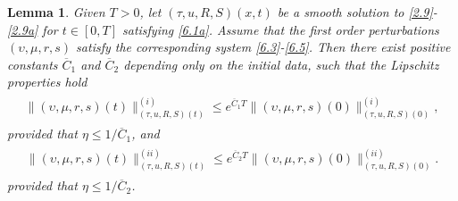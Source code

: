 \documentclass[11pt,reqno]{article}
\newtheorem{lem}{Lemma}
\numberwithin{equation}{section}
\begin{document}
\begin{lem}\label{lem6}
Given $T>0$, let $(\tau, u, R, S)(x,t)$ be a smooth solution to \eqref{2.9}-\eqref{2.9a} for $t\in[0,T]$ satisfying \eqref{6.1a}. Assume that the first order perturbations $(\upsilon, \mu, r, s)$ satisfy the corresponding system \eqref{6.3}-\eqref{6.5}. Then there exist positive constants $\overline{C}_1$ and $\overline{C}_2$ depending only on the initial data, such that the Lipschitz properties hold
\begin{align}\label{6.22a}
\begin{split}
\|(\upsilon, \mu, r, s)(t)\|_{(\tau, u, R, S)(t)}^{(i)}\leq e^{\overline{C}_1T}\|(\upsilon, \mu, r, s)(0)\|_{(\tau, u, R, S)(0)}^{(i)},
\end{split}
\end{align}
provided that $\eta\leq 1/\overline{C}_1$, and
\begin{align}\label{6.22}
\begin{split}
\|(\upsilon, \mu, r, s)(t)\|_{(\tau, u, R, S)(t)}^{(ii)}\leq e^{\overline{C}_2T}\|(\upsilon, \mu, r, s)(0)\|_{(\tau, u, R, S)(0)}^{(ii)}.
\end{split}
\end{align}
provided that $\eta\leq 1/\overline{C}_2$.
\end{lem}
\end{document}
